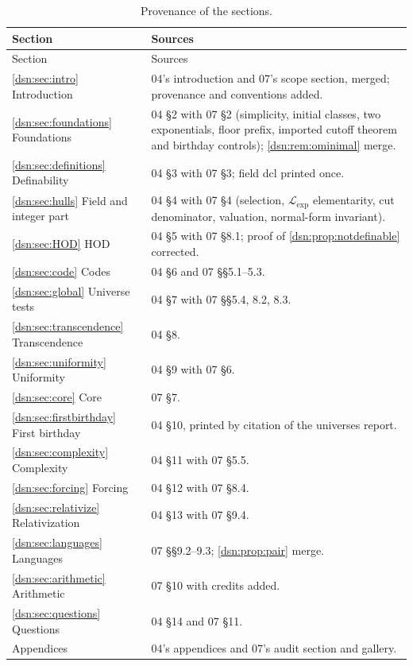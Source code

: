 \documentclass[11pt,a4paper]{article}
\numberwithin{equation}{section}
\theoremstyle{definition}
\theoremstyle{remark}
\newcommand{\Lexp}{\mathcal L_{\exp}}
\begin{document}
\begin{longtable}{@{}P{0.30\textwidth}P{0.64\textwidth}@{}}
\caption{Provenance of the sections.}\label{dsn:tab:sections}\\
\toprule
Section & Sources\\
\midrule
\endfirsthead
\toprule
Section & Sources\\
\midrule
\endhead
\ref{dsn:sec:intro} Introduction & 04's introduction and 07's scope
section, merged; provenance and conventions added.\\
\ref{dsn:sec:foundations} Foundations & 04 \S2 with 07 \S2 (simplicity,
initial classes, two exponentials, floor prefix, imported cutoff theorem
and birthday controls); \cref{dsn:rem:ominimal} merge.\\
\ref{dsn:sec:definitions} Definability & 04 \S3 with 07 \S3; field dcl
printed once.\\
\ref{dsn:sec:hulls} Field and integer part & 04 \S4 with 07 \S4 (selection,
$\Lexp$ elementarity, cut denominator, valuation, normal-form invariant).\\
\ref{dsn:sec:HOD} HOD & 04 \S5 with 07 \S8.1; proof of
\cref{dsn:prop:notdefinable} corrected.\\
\ref{dsn:sec:code} Codes & 04 \S6 and 07 \S\S5.1--5.3.\\
\ref{dsn:sec:global} Universe tests & 04 \S7 with 07 \S\S5.4, 8.2, 8.3.\\
\ref{dsn:sec:transcendence} Transcendence & 04 \S8.\\
\ref{dsn:sec:uniformity} Uniformity & 04 \S9 with 07 \S6.\\
\ref{dsn:sec:core} Core & 07 \S7.\\
\ref{dsn:sec:firstbirthday} First birthday & 04 \S10, printed by citation of
the universes report.\\
\ref{dsn:sec:complexity} Complexity & 04 \S11 with 07 \S5.5.\\
\ref{dsn:sec:forcing} Forcing & 04 \S12 with 07 \S8.4.\\
\ref{dsn:sec:relativize} Relativization & 04 \S13 with 07 \S9.4.\\
\ref{dsn:sec:languages} Languages & 07 \S\S9.2--9.3; \cref{dsn:prop:pair}
merge.\\
\ref{dsn:sec:arithmetic} Arithmetic & 07 \S10 with credits added.\\
\ref{dsn:sec:questions} Questions & 04 \S14 and 07 \S11.\\
Appendices & 04's appendices and 07's audit section and gallery.\\
\bottomrule
\end{longtable}
\end{document}
